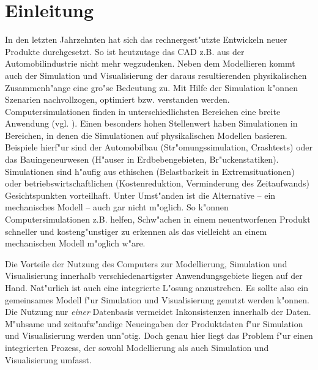 %
%

\chapter{Einleitung}

%
%

In den letzten Jahrzehnten hat sich das rechnergest"utzte Entwickeln neuer
Produkte durchgesetzt. So ist heutzutage das CAD z.B. aus der 
Automobilindustrie nicht mehr wegzudenken. 
Neben dem Modellieren kommt auch der Simulation und Visualisierung 
der daraus resultierenden physikalischen Zusammenh"ange eine gro"se Bedeutung 
zu. Mit Hilfe der Simulation k"onnen Szenarien nachvollzogen, optimiert bzw. 
verstanden werden. Computersimulationen finden in unterschiedlichsten
Bereichen eine breite Anwendung (vgl. \cite{gl_modell_sim}). Einen besonders 
hohen Stellenwert haben Simulationen in Bereichen, in denen die Simulationen 
auf physikalischen Modellen basieren. Beispiele hierf"ur sind der Automobilbau 
(Str"omungssimulation, Crashtests) oder das Bauingeneurwesen (H"auser in 
Erdbebengebieten, Br"uckenstatiken). Simulationen sind h"aufig aus ethischen 
(Belastbarkeit in Extremsituationen) oder betriebswirtschaftlichen 
(Kostenreduktion, Verminderung des Zeitaufwands) Gesichtspunkten vorteilhaft. 
Unter Umst"anden ist die Alternative -- ein mechanisches Modell -- auch gar 
nicht m"oglich. So k"onnen Computersimulationen z.B. helfen, Schw"achen in 
einem neuentworfenen Produkt schneller und kosteng"unstiger zu erkennen als 
das vielleicht an einem mechanischen Modell m"oglich w"are. 

Die Vorteile der Nutzung des Computers zur Modellierung, Simulation und 
Visualisierung innerhalb verschiedenartigster Anwendungsgebiete
liegen auf der Hand. Nat"urlich ist auch eine integrierte L"osung 
anzustreben. Es sollte also ein gemeinsames Modell f"ur Simulation
und Visualisierung genutzt werden k"onnen. Die Nutzung nur \emph{einer}
Datenbasis vermeidet Inkonsistenzen innerhalb der Daten. M"uhsame
und zeitaufw"andige Neueingaben der Produktdaten f"ur Simulation
und Visualisierung werden unn"otig. Doch genau hier liegt das Problem
f"ur einen integrierten Prozess, der sowohl Modellierung als auch
Simulation und Visualisierung umfasst.

